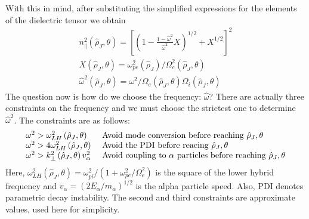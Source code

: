 With this in mind, after substituting the simplified expressions for the elements of the dielectric tensor we obtain
\begin{equation}
	\label{eq:lhcd_6}
	\begin{array} { c } { n _ { \| } ^ { 2 } \left( \hat { \rho } _ { J } , \theta \right) = \left[ \left( 1 - \frac { 1 - \hat { \omega } ^ { 2 } } { \hat { \omega } ^ { 2 } } X \right) ^ { 1 / 2 } + X ^ { 1 / 2 } \right] ^ { 2 } } \\ { X \left( \hat { \rho } _ { J } , \theta \right) = \omega _ { p e } ^ { 2 } \left( \hat { \rho } _ { J } \right) / \Omega _ { e } ^ { 2 } \left( \hat { \rho } _ { J } , \theta \right) } \\ { \hat { \omega } ^ { 2 } \left( \hat { \rho } _ { J } , \theta \right) = \omega ^ { 2 } / \Omega _ { e } \left( \hat { \rho } _ { J } , \theta \right) \Omega _ { i } \left( \hat { \rho } _ { J } , \theta \right) } \end{array}
\end{equation}
The question now is how do we choose the frequency: $\hat \omega$? There are actually three constraints on the frequency and we must choose the strictest one to determine $\hat \omega^2$. The constraints are as follows:
\begin{equation}
	\begin{array} { l l } { \omega ^ { 2 } > \omega _ { L H } ^ { 2 } \left( \hat { \rho } _ { J } , \theta \right) } & { \text { Avoid mode conversion before reaching } \hat { \rho } _ { J } , \theta } \\ { \omega ^ { 2 } > 4 \omega _ { L H } ^ { 2 } \left( \hat { \rho } _ { J } , \theta \right) } & { \text { Avoid the PDI before reacing } \hat { \rho } _ { J } , \theta } \\ { \omega ^ { 2 } > k _ { \perp } ^ { 2 } \left( \hat { \rho } _ { J } , \theta \right) v _ { \alpha } ^ { 2 } } & { \text { Avoid coupling to } \alpha \text { particles before reaching } \hat { \rho } _ { J } , \theta } \end{array}
\end{equation}
Here, $\omega _ { L H } ^ { 2 } \left( \hat { \rho } _ { J } , \theta \right) = \omega _ { p i } ^ { 2 } / \left( 1 + \omega _ { p e } ^ { 2 } / \Omega _ { e } ^ { 2 } \right)$ is the square of the lower hybrid frequency and $v _ { \alpha } = \left( 2 E _ { \alpha } / m _ { \alpha } \right) ^ { 1 / 2 }$ is the alpha particle speed. Also, PDI denotes  parametric decay instability. The second and third constraints are approximate values, used here for simplicity.

